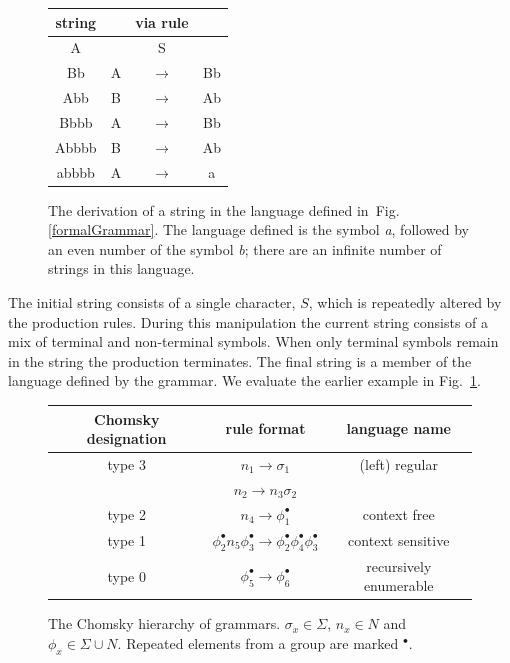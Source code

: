\begin{figure}
\centering
\begin{tabular} { | c | c c c |}
\hline
string &&via rule&\\
\hline
A& &S&\\
Bb& A & $\rightarrow$ & Bb\\
Abb& B & $\rightarrow$ & Ab\\
Bbbb &A & $\rightarrow$ & Bb\\
Abbbb &B & $\rightarrow$ & Ab\\
abbbb& A & $\rightarrow$ & a\\
\hline
\end{tabular}
\caption[A formal grammar derivation]{The derivation of a string in the language defined in~Fig.\ref{formalGrammar}. The language defined is the symbol \emph{a}, followed by an even number of the symbol \emph{b}; there are an infinite number of strings in this language.}
\label{formalGrammarResult}
\end{figure}

The initial string consists of a single character, $S$, which is repeatedly altered by the production rules. During this manipulation the current string consists of a mix of terminal and non-terminal symbols. When only terminal symbols remain in the string the production terminates. The final string is a member of the language defined by the grammar. We evaluate the earlier example in Fig.~\ref{formalGrammarResult}.

\begin{figure}
\centering
\begin{tabular} { |c|c|c| }
\hline
Chomsky designation & rule format & language name\\
\hline
type 3 & $n_1 \rightarrow \sigma_1$ & (left) regular\\
&$n_2 \rightarrow n_3\sigma_2$ &\\
type 2 & $n_4 \rightarrow \phi_1^{\bullet}$ & context free\\
type 1 & $\phi_2^{\bullet}n_5\phi_3^{\bullet} \rightarrow \phi_2^{\bullet}\phi_4^{\bullet}\phi_3^{\bullet}$ & context sensitive\\
type 0 & $\phi_5^{\bullet} \rightarrow \phi_6^{\bullet}$ & recursively enumerable\\
\hline
\end{tabular}
\caption[The Chomsky Hierarchy]{The Chomsky hierarchy of grammars. $\sigma_x \in \Sigma$, $n_x \in N$ and $\phi_x \in \Sigma \cup N$. Repeated elements from a group are marked ${ }^\bullet$.}
\label{chomskyHierarchy}
\end{figure}

